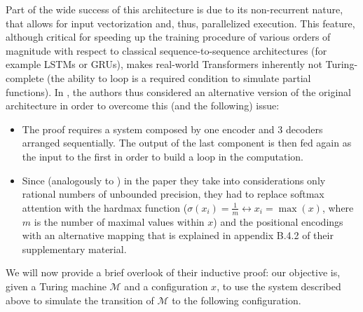 \documentclass{article}
\begin{document}
Part of the wide success of this architecture is due to its non-recurrent nature, that allows for input vectorization and, thus, parallelized execution. This feature, although critical for speeding up the training procedure of various orders of magnitude with respect to classical sequence-to-sequence architectures (for example LSTMs or GRUs), makes real-world Transformers inherently not Turing-complete (the ability to loop is a required condition to simulate partial functions). In \cite{PER19}, the authors thus considered an alternative version of the original architecture in order to overcome this (and the following) issue:

\begin{itemize}
    \item The proof requires a system composed by one encoder and 3 decoders arranged sequentially. The output of the last component is then fed again as the input to the first in order to build a loop in the computation.
    \item Since (analogously to \cite{SIE95}) in the paper they take into considerations only rational numbers of unbounded precision, they had to replace softmax attention with the hardmax function ($\sigma(x_i)=\frac{1}{m} \leftrightarrow x_i = \max(x)$, where $m$ is the number of maximal values within $x$) and the positional encodings with an alternative mapping that is explained in appendix B.4.2 of their supplementary material. 
\end{itemize}

We will now provide a brief overlook of their inductive proof: our objective is, given a Turing machine $\mathcal{M}$ and a configuration $x$, to use the system described above to simulate the transition of $\mathcal{M}$ to the following configuration.
\end{document}
